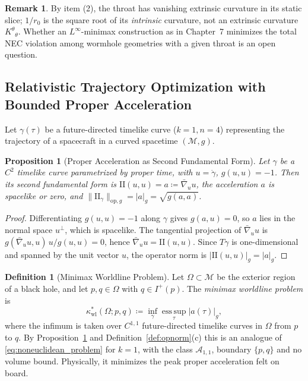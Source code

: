 \documentclass[11pt,reqno]{amsart}
\newtheorem{proposition}[theorem]{Proposition}
\theoremstyle{definition}
\newtheorem{definition}[theorem]{Definition}
\newtheorem{remark}[theorem]{Remark}
\providecommand{\II}{\mathrm{I\!I}}
\newcommand{\op}{\mathrm{op}}
\numberwithin{equation}{section}
\providecommand{\II}{\mathrm{II}}
\begin{document}
\begin{remark}
By item (2), the throat has vanishing extrinsic curvature in its static slice; $1/r_0$ is the square root of its \emph{intrinsic} curvature, not an extrinsic curvature $K^\theta{}_\theta$. Whether an $L^\infty$-minimax construction as in Chapter~7 minimizes the total NEC violation among wormhole geometries with a given throat is an open question.
\end{remark}

\subsection{Relativistic Trajectory Optimization with Bounded Proper Acceleration}
Let $\gamma(\tau)$ be a future-directed timelike curve ($k=1, n=4$) representing the trajectory of a spacecraft in a curved spacetime $(\mathcal{M}, g)$.

\begin{proposition}[Proper Acceleration as Second Fundamental Form]
\label{prop:proper_accel}
Let $\gamma$ be a $C^2$ timelike curve parametrized by proper time, with $u = \dot\gamma$, $g(u,u) = -1$. Then its second fundamental form is $\II(u,u) = a \coloneqq \bar\nabla_u u$, the acceleration $a$ is spacelike or zero, and $\|\II_\gamma\|_{\op,g} = |a|_g = \sqrt{g(a,a)}$.
\end{proposition}
\begin{proof}
Differentiating $g(u,u) = -1$ along $\gamma$ gives $g(a,u) = 0$, so $a$ lies in the normal space $u^\perp$, which is spacelike. The tangential projection of $\bar\nabla_u u$ is $g(\bar\nabla_u u, u)\, u / g(u,u) = 0$, hence $\bar\nabla_u u = \II(u,u)$. Since $T\gamma$ is one-dimensional and spanned by the unit vector $u$, the operator norm is $|\II(u,u)|_g = |a|_g$.
\end{proof}

\begin{definition}[Minimax Worldline Problem]
\label{def:minimax_worldline}
Let $\Omega \subset \mathcal{M}$ be the exterior region of a black hole, and let $p, q \in \Omega$ with $q \in I^+(p)$. The \emph{minimax worldline problem} is
\begin{equation}
\kappa^*_{\mathrm{wl}}(\Omega; p, q) \coloneqq \inf_{\gamma} \operatorname*{ess\,sup}_{\tau} |a(\tau)|_g,
\end{equation}
where the infimum is taken over $C^{1,1}$ future-directed timelike curves in $\Omega$ from $p$ to $q$. By Proposition~\ref{prop:proper_accel} and Definition~\ref{def:opnorm}(c) this is an analogue of \eqref{eq:noneuclidean_problem} for $k = 1$, with the class $\mathcal{A}_{1,1}$, boundary $\{p, q\}$ and no volume bound. Physically, it minimizes the peak proper acceleration felt on board.
\end{definition}
\end{document}
